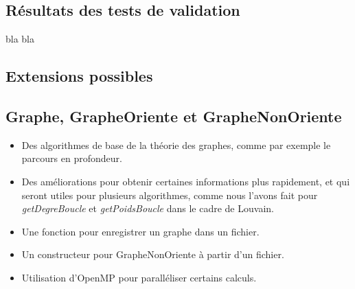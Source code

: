 \begin{titlepage}
{}


\newpage
\begin{center}
\begin{bf}
\section{Résultats des tests de validation}
\end{bf}
\end{center}

\vspace{1cm}
{
bla bla
}


\newpage
\begin{center}
\begin{bf}
\section{Extensions possibles}
\end{bf}
\end{center}

\vspace{1cm}
\subsection{Graphe, GrapheOriente et GrapheNonOriente}
{
\begin{itemize}
    \item Des algorithmes de base de la théorie des graphes, comme par exemple le parcours en profondeur.
    \item Des améliorations pour obtenir certaines informations plus rapidement, et qui seront utiles pour plusieurs algorithmes, comme nous l'avons fait pour \textit{getDegreBoucle} et \textit{getPoidsBoucle} dans le cadre de Louvain.
    \item Une fonction pour enregistrer un graphe dans un fichier.
    \item Un constructeur pour GrapheNonOriente à partir d'un fichier.
    \item Utilisation d'OpenMP pour paralléliser certains calculs.
\end{itemize}
}


\end{titlepage}
